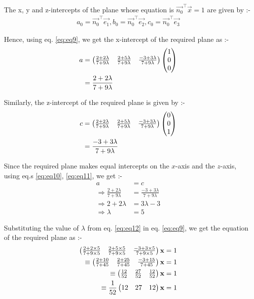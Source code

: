 \documentclass[journal,12pt,twocolumn]{IEEEtran}
\renewcommand\thesection{\arabic{section}}
\begin{document}
\begin{enumerate}[label=\thesection.\arabic*.,ref=\thesection.\theenumi]
The x, y and z-intercepts of the plane whose equation is $\vec{n_0}^{\top}\vec{x} = 1$ are given by :-
\begin{align}
a_0 = \vec{n_0}^{\top}\vec{e_1}, b_0 = \vec{n_0}^{\top}\vec{e_2}, c_0 = \vec{n_0}^{\top}\vec{e_3}
\end{align}

Hence, using eq. \eqref{eq:eq9}, we get the x-intercept of the required plane as :-
\begin{align}
a &= \begin{pmatrix}\frac{2 + 2 \lambda}{7 + 9 \lambda} & \frac{2 + 5 \lambda}{7 + 9 \lambda} & \frac{-3 + 3 \lambda}{7 + 9 \lambda}\end{pmatrix} \begin{pmatrix}1 \\ 0 \\ 0\end{pmatrix} \\
   &= \frac{2 + 2 \lambda}{7 + 9 \lambda} \label{eq:eq10}
\end{align}

Similarly, the z-intercept of the required plane is given by :-
\begin{align}
c &= \begin{pmatrix}\frac{2 + 2 \lambda}{7 + 9 \lambda} & \frac{2 + 5 \lambda}{7 + 9 \lambda} & \frac{-3 + 3 \lambda}{7 + 9 \lambda}\end{pmatrix} \begin{pmatrix}0 \\ 0 \\ 1\end{pmatrix} \\
   &= \frac{-3 + 3 \lambda}{7 + 9 \lambda} \label{eq:eq11}
\end{align}

Since the required plane makes equal intercepts on the $x$-axis and the $z$-axis, using eq.s \eqref{eq:eq10}, \eqref{eq:eq11}, we get :-
\begin{align}
a &= c \\
\Rightarrow\frac{2 + 2 \lambda}{7 + 9 \lambda} &= \frac{-3 + 3 \lambda}{7 + 9 \lambda}
\\
\Rightarrow 2 + 2 \lambda &= 3 \lambda - 3
\\
\Rightarrow \lambda &= 5 \label{eq:eq12}
\end{align}

Substituting the value of $\lambda$ from eq. \eqref{eq:eq12} in eq. \eqref{eq:eq9}, we get the equation of the required plane as :-
\begin{align}
\begin{pmatrix}\frac{2 + 2 \times 5}{7 + 9 \times 5} & \frac{2 + 5 \times 5}{7 + 9 \times 5} & \frac{-3 + 3 \times 5}{7 + 9 \times 5}\end{pmatrix}\mathbf{x} = 1
\\
\equiv \begin{pmatrix}\frac{2 + 10}{7 + 45} & \frac{2 + 25}{7 + 45} & \frac{-3 + 15}{7 + 45}\end{pmatrix}\mathbf{x} = 1
\\
\equiv \begin{pmatrix}\frac{12}{52} & \frac{27}{52} & \frac{12}{52}\end{pmatrix}\mathbf{x} = 1
\\
\equiv \frac{1}{52} \begin{pmatrix}12 & 27 & 12\end{pmatrix}\mathbf{x} = 1
\end{align}


\end{enumerate}
\end{document}
